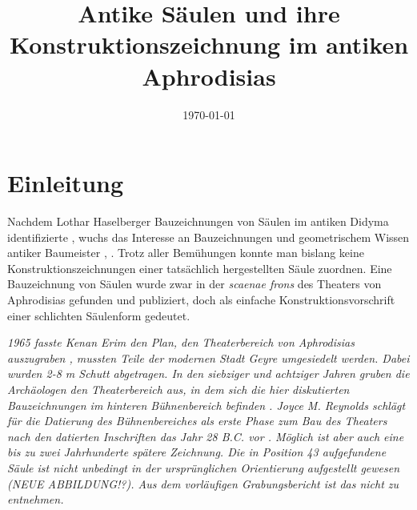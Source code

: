 \documentclass[twocolumn]{bmcart}
\begin{document}
\title{Antike Säulen und ihre Konstruktionszeichnung im antiken Aphrodisias}


\date{\today}%


\tableofcontents



\maketitle



\thispagestyle{empty}

\section{Einleitung}



Nachdem Lothar Haselberger Bauzeichnungen von Säulen im antiken  Didyma identifizierte \cite{haselbergerlothar1980},  wuchs das Interesse an Bauzeichnungen und geometrischem Wissen antiker Baumeister \cite{haselbergerlothar1999}, \cite{rennjurgen-1}. Trotz aller Bemühungen konnte man bislang keine Konstruktionszeichnungen einer tatsächlich hergestellten  Säule zuordnen. Eine Bauzeichnung von Säulen wurde zwar in der \textit{scaenae frons} des Theaters von Aphrodisias gefunden und publiziert, doch als einfache Konstruktionsvorschrift einer schlichten Säulenform gedeutet.  

\textit{1965 fasste Kenan Erim  den Plan, den Theaterbereich von Aphrodisias auszugraben \cite[p. 7]{smith1991}, mussten  Teile der modernen Stadt Geyre umgesiedelt werden. Dabei wurden 2-8 m Schutt abgetragen. In den siebziger und achtziger Jahren gruben die Archäologen den Theaterbereich aus, in dem sich die hier diskutierten Bauzeichnungen im hinteren Bühnenbereich befinden \cite[p. 7]{smith1991}. Joyce M. Reynolds schlägt für die Datierung des Bühnenbereiches als erste Phase zum Bau des Theaters nach den datierten Inschriften das Jahr 28 B.C. vor \cite[p. 15]{reynolds1991}.
Möglich ist aber auch eine bis zu zwei Jahrhunderte spätere Zeichnung. Die in Position 43 aufgefundene Säule ist nicht unbedingt in der ursprünglichen Orientierung aufgestellt gewesen (NEUE ABBILDUNG!?). Aus dem vorläufigen Grabungsbericht ist das nicht zu entnehmen.}
\end{document}
